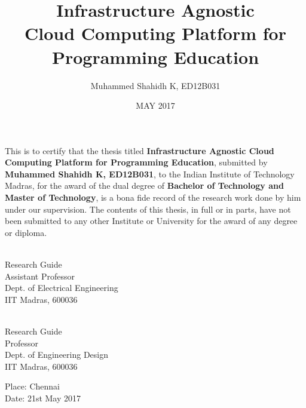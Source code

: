 \documentclass[DD]{iitmdiss}
\begin{document}

\title{Infrastructure Agnostic\\
	 Cloud Computing Platform for Programming Education}

\author{Muhammed Shahidh K, ED12B031}

\date{MAY 2017}

\maketitle

\certificate

\vspace*{0.5in}

\noindent This is to certify that the thesis titled {\bf Infrastructure Agnostic Cloud Computing Platform for Programming Education}, submitted by {\bf Muhammed Shahidh K, ED12B031}, 
  to the Indian Institute of Technology Madras, for
the award of the dual degree of {\bf Bachelor of Technology and Master of Technology}, is a bona fide
record of the research work done by him under our supervision.  The
contents of this thesis, in full or in parts, have not been submitted
to any other Institute or University for the award of any degree or
diploma.

\vspace*{1.5in}

\begin{singlespacing}
\hspace*{-0.25in}
\parbox{2.5in}{
 \\
\noindent Research Guide \\ 
\noindent Assistant Professor \\
\noindent Dept. of Electrical Engineering\\
\noindent IIT Madras, 600036 \\
} 
\hspace*{1.0in} 
\parbox{2.5in}{
 \\
\noindent Research Guide \\ 
\noindent Professor \\
\noindent Dept. of Engineering Design\\
\noindent IIT Madras, 600036 \\
}  
\end{singlespacing}
\vspace*{0.25in}
\noindent Place: Chennai\\
Date: 21st May 2017 
\end{document}

